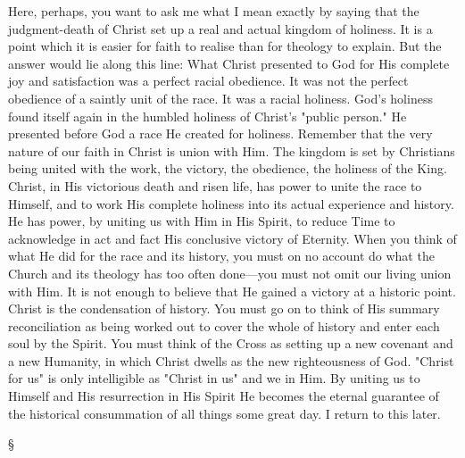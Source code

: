 \documentclass[12pt,letterpaper,oneside]{book}
\begin{document}
Here, perhaps, you want to ask me what I 
mean exactly by saying that the judgment-death 
of Christ set up a real and actual kingdom of 
holiness. It is a point which it is easier for 
faith to realise than for theology to explain. 
But the answer would lie along this line: What 
Christ presented to God for His complete joy 
and satisfaction was a perfect racial obedience. 
It was not the perfect obedience of a saintly 
unit of the race. It was a racial holiness. God's 
holiness found itself again in the humbled holiness 
of Christ's "public person." He presented 
before God a race He created for holiness. Remember 
that the very nature of our faith in 
Christ is union with Him. The kingdom is set 
by Christians being united with the work, the 
victory, the obedience, the holiness of the King. 
Christ, in His victorious death and risen life, 
has power to unite the race to Himself, and 
to work His complete holiness into its actual 
experience and history. He has power, by 
uniting us with Him in His Spirit, to reduce 
Time to acknowledge in act and fact His 
conclusive victory of Eternity. When you 
think of what He did for the race and its 
history, you must on no account do what the 
Church and its theology has too often done---you 
must not omit our living union with Him. 
It is not enough to believe that He gained a 
victory at a historic point. Christ is the 
condensation of history. You must go on to 
think of His summary reconciliation as being 
worked out to cover the whole of history and 
enter each soul by the Spirit. You must think 
of the Cross as setting up a new covenant and 
a new Humanity, in which Christ dwells as the 
new righteousness of God. "Christ for us" is 
only intelligible as "Christ in us" and we in Him. 
By uniting us to Himself and His resurrection 
in His Spirit He becomes the eternal guarantee 
of the historical consummation of all things 
some great day. I return to this later. 

\begin{center}
\S
\end{center}
\end{document}
